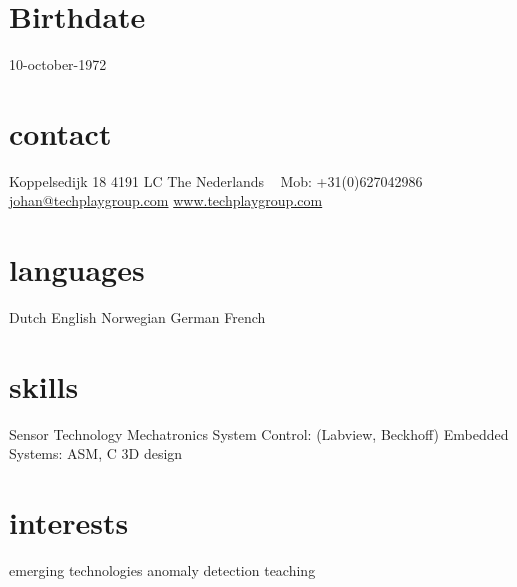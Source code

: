 \documentclass[print]{friggeri-cv} %
\begin{document}

\begin{aside} %
\section{Birthdate}
10-october-1972
\section{contact}
Koppelsedijk 18
4191 LC
The Nederlands
~
Mob: +31(0)627042986
~
\href{mailto:johan@techplaygroup.com}{johan@techplaygroup.com}
\href{http://www.techplaygroup.com}{www.techplaygroup.com}
\section{languages}
Dutch
English
Norwegian
German
French
\section{skills}
{Sensor Technology
Mechatronics
System Control:
(Labview, Beckhoff)
Embedded Systems:
ASM, C
3D design}
\section{interests}
emerging technologies
anomaly detection
teaching
\end{aside}


\end{document}
